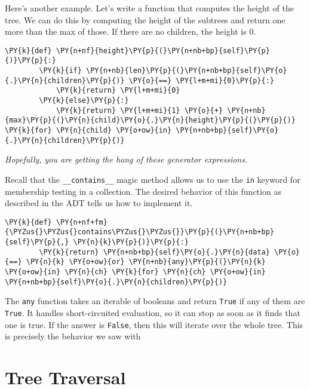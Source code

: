 Here's another example.  Let's write a function that computes the height of the tree.  We can do this by computing the height of the subtrees and return one more than the max of those.  If there are no children, the height is $0$.

\begin{Verbatim}[commandchars=\\\{\}]
    \PY{k}{def} \PY{n+nf}{height}\PY{p}{(}\PY{n+nb+bp}{self}\PY{p}{)}\PY{p}{:}
        \PY{k}{if} \PY{n+nb}{len}\PY{p}{(}\PY{n+nb+bp}{self}\PY{o}{.}\PY{n}{children}\PY{p}{)} \PY{o}{==} \PY{l+m+mi}{0}\PY{p}{:}
            \PY{k}{return} \PY{l+m+mi}{0}
        \PY{k}{else}\PY{p}{:}
            \PY{k}{return} \PY{l+m+mi}{1} \PY{o}{+} \PY{n+nb}{max}\PY{p}{(}\PY{n}{child}\PY{o}{.}\PY{n}{height}\PY{p}{(}\PY{p}{)} \PY{k}{for} \PY{n}{child} \PY{o+ow}{in} \PY{n+nb+bp}{self}\PY{o}{.}\PY{n}{children}\PY{p}{)}
\end{Verbatim}



\emph{Hopefully, you are getting the hang of these generator expressions.}


Recall that the \texttt{\_\_contains\_\_} magic method allows us to use the \texttt{in} keyword for membership testing in a collection.
The desired behavior of this function as described in the ADT tells us how to implement it.

\begin{Verbatim}[commandchars=\\\{\}]
    \PY{k}{def} \PY{n+nf+fm}{\PYZus{}\PYZus{}contains\PYZus{}\PYZus{}}\PY{p}{(}\PY{n+nb+bp}{self}\PY{p}{,} \PY{n}{k}\PY{p}{)}\PY{p}{:}
        \PY{k}{return} \PY{n+nb+bp}{self}\PY{o}{.}\PY{n}{data} \PY{o}{==} \PY{n}{k} \PY{o+ow}{or} \PY{n+nb}{any}\PY{p}{(}\PY{n}{k} \PY{o+ow}{in} \PY{n}{ch} \PY{k}{for} \PY{n}{ch} \PY{o+ow}{in} \PY{n+nb+bp}{self}\PY{o}{.}\PY{n}{children}\PY{p}{)}
\end{Verbatim}



The \texttt{any} function takes an iterable of booleans and return \texttt{True} if any of them are \texttt{True}.
It handles short-circuited evaluation, so it can stop as soon as it finds that one is true.
If the answer is \texttt{False}, then this will iterate over the whole tree.
This is precisely the behavior we saw with

\section{Tree Traversal}


